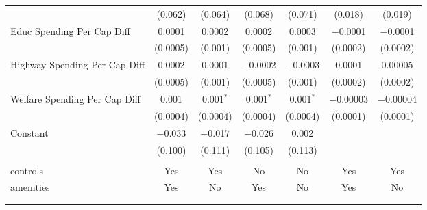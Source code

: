 \begin{table}[!htbp]
\begin{tabular}{@{\extracolsep{5pt}}lcccccc}
  & (0.062) & (0.064) & (0.068) & (0.071) & (0.018) & (0.019) \\ 
  Educ Spending Per Cap Diff & 0.0001 & 0.0002 & 0.0002 & 0.0003 & $-$0.0001 & $-$0.0001 \\ 
  & (0.0005) & (0.001) & (0.0005) & (0.001) & (0.0002) & (0.0002) \\ 
  Highway Spending Per Cap Diff & 0.0002 & 0.0001 & $-$0.0002 & $-$0.0003 & 0.0001 & 0.00005 \\ 
  & (0.0005) & (0.001) & (0.0005) & (0.001) & (0.0002) & (0.0002) \\ 
  Welfare Spending Per Cap Diff & 0.001 & 0.001$^{*}$ & 0.001$^{*}$ & 0.001$^{*}$ & $-$0.00003 & $-$0.00004 \\ 
  & (0.0004) & (0.0004) & (0.0004) & (0.0004) & (0.0001) & (0.0001) \\ 
  Constant & $-$0.033 & $-$0.017 & $-$0.026 & 0.002 &  &  \\ 
  & (0.100) & (0.111) & (0.105) & (0.113) &  &  \\ 
 \hline \\[-1.8ex] 
controls & Yes & Yes & No & No & Yes & Yes \\ 
amenities & Yes & No & Yes & No & Yes & No \\ 
\hline \\[-1.8ex] 
\hline 
\hline \\[-1.8ex] 
\end{tabular} 
\end{table} 
